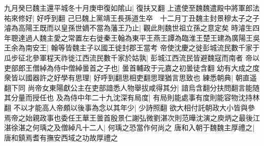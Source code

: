 九月癸巳魏主還平城冬十月庚申復如隂山|{
	復扶又翻}
上遣使至魏魏遣殿中將軍郎法祐來修好|{
	好呼到翻}
己巳魏上黨靖王長孫道生卒　十二月丁丑魏主封景穆太子之子濬為高陽王既而以皇孫世嫡不當為藩王乃止|{
	觀此則魏世祖立孫之意定矣}
時濬生四年聰達過人魏主愛之常置左右徙秦王翰為東平王燕王譚為臨淮王楚王建為廣陽王吳王余為南安王|{
	翰等皆魏主子以國王徙封郡王當考}
帝使沈慶之徙彭城流民數千家于瓜步征北參軍程天祚徙江西流民數千家於姑孰|{
	彭城江西流民皆避魏寇而南者}
帝以吏部郎王僧綽為侍中僧綽曇首之子也|{
	曇首輔政于元嘉之初曇徒含翻}
幼有大成之度衆皆以國器許之好學有思理|{
	好呼到翻思相吏翻思理猶言思致也}
練悉朝典|{
	朝直遥翻下同}
尚帝女東陽獻公主在吏部諳悉人物舉拔咸得其分|{
	諳烏含翻分扶問翻言能随其分量而授任也}
及為侍中年二十九沈深有局度|{
	有局則能處事有度則能容物沈持林翻}
不以才能高人帝頗以後事為念以其年少|{
	少詩照翻}
欲大相付託朝政大小皆與參焉帝之始親政事也委任王華王曇首殷景仁謝弘微劉湛次則范曄沈演之庾炳之最後江湛徐湛之何瑀之及僧綽凡十二人|{
	何瑀之恐當作何尚之}
唐和入朝于魏魏主厚禮之|{
	唐和鎮焉耆有撫安西域之功故厚禮之}


